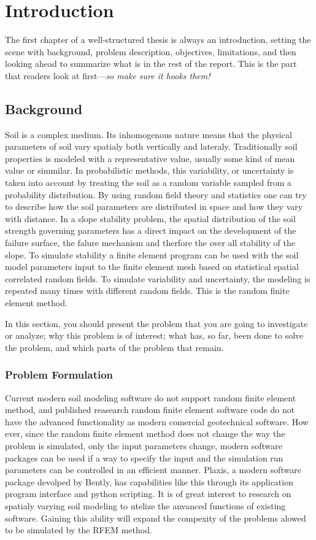 \chapter{Introduction}
The first chapter of a well-structured thesis is always an introduction, setting the scene with background, problem description, objectives, limitations, and then looking ahead to summarize what is in the rest of the report. This is the part that readers look at first---\emph{so make sure it hooks them!}

\section{Background}
Soil is a complex medium.
Its inhomogenous nature means that the physical parameters of soil vary spatialy both vertically and lateraly.
Traditionally soil properties is modeled with a representative value, usually some kind of mean value or simmilar.
In probabilistic methods, this variability, or uncertainty is taken into account by treating the soil as a random variable sampled from a probability distribution.
By using random field theory and statistics one can try to describe how the soil parameters are distributed in space and how they vary with distance.
In a slope stability problem, the spatial distribution of the soil strength governing parameters has a direct impact on the development of the failure surface, the falure mechanism and therfore the over all stability of the slope.
To simulate stability a finite element program can be used with the soil model parameters input to the finite element mesh based on statistical spatial correlated random fields.
To simulate variability and uncertainty, the modeling is repeated many times with different random fields.
This is the random finite element method.


In this section, you should present the problem that you are going to investigate or analyze; why this problem is of interest; what has, so far, been done to solve the problem, and which parts of the problem that remain.
\subsection*{Problem Formulation}
Current modern soil modeling software do not support random finite element method, and published reasearch random finite element software code do not have the advanced functionality as modern comercial geotechnical software.
How ever, since the random finite element method does not change the way the problem is simulated, only the input parameters change, modern software packages can be used if a way to specify the input and the simulation run parameters can be controlled in an efficient manner.
Plaxis, a modern software package devolped by Bently, has capabilities like this through its application program interface and python scripting. 
It is of great interest to research on spatialy varying soil modeling to utelize the anvanced functions of existing software. Gaining this ability will expand the compexity of the problems alowed to be simulated by the RFEM method.


